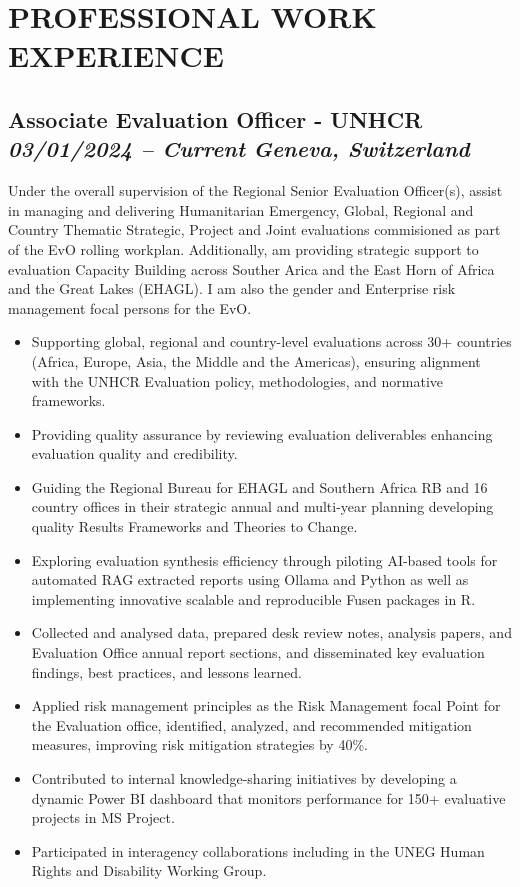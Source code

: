 \documentclass[
  10pt,
]{article}
\providecommand{\tightlist}{%
  \setlength{\itemsep}{0pt}\setlength{\parskip}{0pt}}
\begin{document}
\vspace{0.5cm}

\section{PROFESSIONAL WORK EXPERIENCE}\label{work-experience}

\subsection{\texorpdfstring{Associate Evaluation Officer - UNHCR
\emph{03/01/2024 -- Current} \textbar{} \emph{Geneva, Switzerland}}{Associate Evaluation Officer - UNHCR 03/01/2024 -- Current \textbar{} Geneva, Switzerland}}\label{associate-evaluation-officer---unhcr-03012024-current-geneva-switzerland}

Under the overall supervision of the Regional Senior Evaluation Officer(s), assist in managing and delivering Humanitarian Emergency, Global, Regional and Country Thematic Strategic, Project and Joint evaluations commisioned as part of the EvO rolling workplan. Additionally, am providing strategic support to evaluation Capacity Building across Souther Arica and the East Horn of Africa and the Great Lakes (EHAGL). I am also the gender and Enterprise risk management focal persons for the EvO.

\begin{itemize}
\tightlist
\item
Supporting global, regional and country-level evaluations across 30+ countries (Africa, Europe, Asia, the Middle and the Americas), ensuring alignment with the UNHCR Evaluation policy, methodologies, and normative frameworks.
\item
Providing quality assurance by reviewing evaluation deliverables enhancing evaluation quality and credibility.
\item
Guiding the Regional Bureau for EHAGL and Southern Africa RB and 16 country offices in their strategic annual and multi-year planning developing quality Results Frameworks and Theories to Change.
\item
Exploring evaluation synthesis efficiency through piloting AI-based tools for automated RAG extracted reports using Ollama and Python as well as implementing innovative scalable and reproducible Fusen packages in R.
\item
Collected and analysed data, prepared desk review notes, analysis papers, and Evaluation Office annual report sections, and disseminated key evaluation findings, best practices, and lessons learned.
\item
Applied risk management principles as the Risk Management focal Point for the Evaluation office, identified, analyzed, and recommended mitigation measures, improving risk mitigation strategies by 40\%.
\item
Contributed to internal knowledge-sharing initiatives by developing a dynamic Power BI dashboard that monitors performance for 150+ evaluative projects in MS Project.
\item
Participated in interagency collaborations including in the UNEG Human Rights and Disability Working Group.
\end{itemize}
\end{document}
